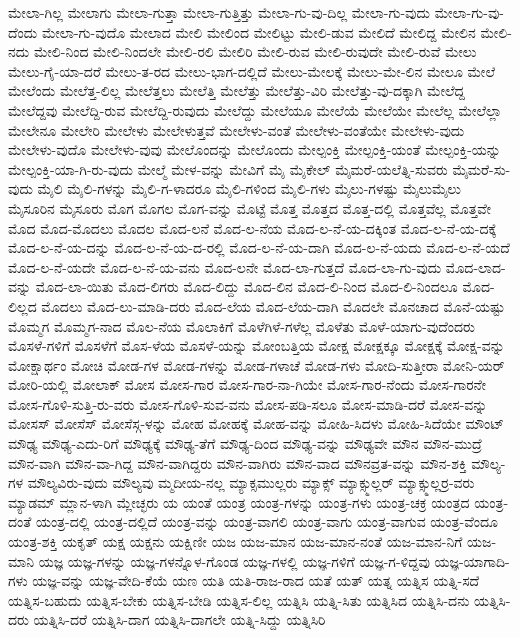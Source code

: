 {ಮೇಲಾ-ಗಿಲ್ಲ
ಮೇಲಾಗು
ಮೇಲಾ-ಗುತ್ತಾ
ಮೇಲಾ-ಗುತ್ತಿತ್ತು
ಮೇಲಾ-ಗು-ವು-ದಿಲ್ಲ
ಮೇಲಾ-ಗು-ವುದು
ಮೇಲಾ-ಗು-ವು-ದೆಂದು
ಮೇಲಾ-ಗು-ವುದೊ
ಮೇಲಾದ
ಮೇಲಿ
ಮೇಲಿಂದ
ಮೇಲಿಟ್ಟು
ಮೇಲಿ-ಡುವ
ಮೇಲಿದೆ
ಮೇಲಿದ್ದ
ಮೇಲಿನ
ಮೇಲಿ-ನದು
ಮೇಲಿ-ನಿಂದ
ಮೇಲಿ-ನಿಂದಲೇ
ಮೇಲಿ-ರಲಿ
ಮೇಲಿರಿ
ಮೇಲಿ-ರುವ
ಮೇಲಿ-ರುವುದೇ
ಮೇಲಿ-ರುವೆ
ಮೇಲು
ಮೇಲು-ಗೈ-ಯಾ-ದರೆ
ಮೇಲು-ತ-ರದ
ಮೇಲು-ಭಾಗ-ದಲ್ಲಿದೆ
ಮೇಲು-ಮೇಲಕ್ಕೆ
ಮೇಲು-ಮೇ-ಲಿನ
ಮೇಲೂ
ಮೇಲೆ
ಮೇಲೆಂದು
ಮೇಲೆತ್ತ-ಲಿಲ್ಲ
ಮೇಲೆತ್ತಲು
ಮೇಲೆತ್ತಿ
ಮೇಲೆತ್ತು
ಮೇಲೆತ್ತು-ವಿರಿ
ಮೇಲೆತ್ತು-ವು-ದಕ್ಕಾಗಿ
ಮೇಲೆದ್ದ
ಮೇಲೆದ್ದವು
ಮೇಲೆದ್ದಿ-ರುವ
ಮೇಲೆದ್ದಿ-ರುವುದು
ಮೇಲೆದ್ದು
ಮೇಲೆಯೂ
ಮೇಲೆಯೆ
ಮೇಲೆಯೇ
ಮೇಲೆಲ್ಲ
ಮೇಲೆಲ್ಲಾ
ಮೇಲೇನೂ
ಮೇಲೇರಿ
ಮೇಲೇಳು
ಮೇಲೇಳುತ್ತವೆ
ಮೇಲೇಳು-ವಂತೆ
ಮೇಲೇಳು-ವಂತೆಯೇ
ಮೇಲೇಳು-ವುದು
ಮೇಲೇಳು-ವುದೊ
ಮೇಲೇಳು-ವುವು
ಮೇಲೊಂದನ್ನು
ಮೇಲೊಂದು
ಮೇಲ್ಪಂಕ್ತಿ
ಮೇಲ್ಪಂಕ್ತಿ-ಯಂತೆ
ಮೇಲ್ಪಂಕ್ತಿ-ಯನ್ನು
ಮೇಲ್ಪಂಕ್ತಿ-ಯಾ-ಗಿ-ರು-ವುದು
ಮೇಲ್ಮೆ
ಮೇಳ-ವನ್ನು
ಮೇವಿಗೆ
ಮೈ
ಮೈಕೇಲ್
ಮೈಮರೆ-ಯಲೆತ್ನಿ-ಸುವರು
ಮೈಮರೆ-ಸು-ವುದು
ಮೈಲಿ
ಮೈಲಿ-ಗಳನ್ನು
ಮೈಲಿ-ಗ-ಳಾದರೂ
ಮೈಲಿ-ಗಳಿಂದ
ಮೈಲಿ-ಗಳು
ಮೈಲು-ಗಳಷ್ಟು
ಮೈಲುಮೈಲು
ಮೈಸೂರಿನ
ಮೈಸೂರು
ಮೊಗ
ಮೊಗಲ
ಮೊಗ-ವನ್ನು
ಮೊಟ್ಟೆ
ಮೊತ್ತ
ಮೊತ್ತದ
ಮೊತ್ತ-ದಲ್ಲಿ
ಮೊತ್ತವೆಲ್ಲ
ಮೊತ್ತವೇ
ಮೊದ
ಮೊದ-ಮೊದಲು
ಮೊದಲ
ಮೊದ-ಲನೆ
ಮೊದ-ಲ-ನೆಯ
ಮೊದ-ಲ-ನೆ-ಯ-ದಕ್ಕಿಂತ
ಮೊದ-ಲ-ನೆ-ಯ-ದಕ್ಕೆ
ಮೊದ-ಲ-ನೆ-ಯ-ದನ್ನು
ಮೊದ-ಲ-ನೆ-ಯ-ದ-ರಲ್ಲಿ
ಮೊದ-ಲ-ನೆ-ಯ-ದಾಗಿ
ಮೊದ-ಲ-ನೆ-ಯದು
ಮೊದ-ಲ-ನೆ-ಯದೆ
ಮೊದ-ಲ-ನೆ-ಯದೇ
ಮೊದ-ಲ-ನೆ-ಯ-ವನು
ಮೊದ-ಲನೇ
ಮೊದ-ಲಾ-ಗುತ್ತದೆ
ಮೊದ-ಲಾ-ಗು-ವುದು
ಮೊದ-ಲಾದ-ವನ್ನು
ಮೊದ-ಲಾ-ಯಿತು
ಮೊದ-ಲಿಗರು
ಮೊದ-ಲಿದ್ದು
ಮೊದ-ಲಿನ
ಮೊದ-ಲಿ-ನಿಂದ
ಮೊದ-ಲಿ-ನಿಂದಲೂ
ಮೊದ-ಲಿಲ್ಲದ
ಮೊದಲು
ಮೊದ-ಲು-ಮಾಡಿ-ದರು
ಮೊದ-ಲೆಯ
ಮೊದ-ಲೆಯ-ದಾಗಿ
ಮೊದಲೇ
ಮೊನಚಾದ
ಮೊನೆ-ಯಷ್ಟು
ಮೊಮ್ಮಗ
ಮೊಮ್ಮಗ-ನಾದ
ಮೊಲ-ನೆಯ
ಮೊಲಾಕಿಗೆ
ಮೊಳೆಗಿಳೆ-ಗಳೆಲ್ಲ
ಮೊಳೆತು
ಮೊಳೆ-ಯಾಗು-ವುದೆಂದರು
ಮೊಸಳೆ-ಗಳಿಗೆ
ಮೊಸಳೆಗೆ
ಮೊಸ-ಳೆಯ
ಮೊಸಳೆ-ಯನ್ನು
ಮೋಂಬತ್ತಿಯ
ಮೋಕ್ಷ
ಮೋಕ್ಷಕ್ಕೂ
ಮೋಕ್ಷಕ್ಕೆ
ಮೋಕ್ಷ-ವನ್ನು
ಮೋಕ್ಷಾರ್ಥಂ
ಮೋಚಿ
ಮೋಡ-ಗಳ
ಮೋಡ-ಗಳನ್ನು
ಮೋಡ-ಗಳಾಚೆ
ಮೋಡ-ಗಳು
ಮೋದಿ-ಸುತ್ತೀರಾ
ಮೋನಿ-ಯರ್
ಮೋರಿ-ಯಲ್ಲಿ
ಮೋಲಾಕ್
ಮೋಸ
ಮೋಸ-ಗಾರ
ಮೋಸ-ಗಾರ-ನಾ-ಗಿಯೇ
ಮೋಸ-ಗಾರ-ನೆಂದು
ಮೋಸ-ಗಾರನೇ
ಮೋಸ-ಗೊಳಿ-ಸುತ್ತಿ-ರು-ವರು
ಮೋಸ-ಗೊಳಿ-ಸುವ-ವನು
ಮೋಸ-ಪಡಿ-ಸಲೂ
ಮೋಸ-ಮಾಡಿ-ದರೆ
ಮೋಸ-ವನ್ನು
ಮೋಸಸ್
ಮೋಸೆಸ್
ಮೋಸೆಸ್ಗ-ಳನ್ನು
ಮೋಹ
ಮೋಹಕ್ಕೆ
ಮೋಹ-ವನ್ನು
ಮೋಹಿ-ಸಿದಳು
ಮೋಹಿ-ಸಿದೆಯೇ
ಮೌಂಟ್
ಮೌಢ್ಯ
ಮೌಢ್ಯ-ಎದು-ರಿಗೆ
ಮೌಢ್ಯಕ್ಕೆ
ಮೌಢ್ಯ-ತೆಗೆ
ಮೌಢ್ಯ-ದಿಂದ
ಮೌಢ್ಯ-ವನ್ನು
ಮೌಢ್ಯವೇ
ಮೌನ
ಮೌನ-ಮುದ್ರೆ
ಮೌನ-ವಾಗಿ
ಮೌನ-ವಾ-ಗಿದ್ದ
ಮೌನ-ವಾಗಿದ್ದರು
ಮೌನ-ವಾಗಿರು
ಮೌನ-ವಾದ
ಮೌನವ್ರತ-ವನ್ನು
ಮೌನ-ಶಕ್ತಿ
ಮೌಲ್ಯ-ಗಳ
ಮೌಲ್ಯವಿರು-ವುದು
ಮೌಲ್ಯವು
ಮ್ಮದೀಯ-ನಲ್ಲ
ಮ್ಯಾಕ್ಸಮುಲ್ಲರು
ಮ್ಯಾಕ್ಸ್
ಮ್ಯಾಕ್ಸ್ಮುಲ್ಲರ್
ಮ್ಯಾಕ್ಸ್ಮುಲ್ಲರ್ರ-ವರು
ಮ್ಯಾಡಮ್
ಮ್ಲಾನ-ಳಾಗಿ
ಮ್ಲೇಚ್ಛರು
ಯ
ಯಂತೆ
ಯಂತ್ರ
ಯಂತ್ರ-ಗಳನ್ನು
ಯಂತ್ರ-ಗಳು
ಯಂತ್ರ-ಚಕ್ರ
ಯಂತ್ರದ
ಯಂತ್ರ-ದಂತೆ
ಯಂತ್ರ-ದಲ್ಲಿ
ಯಂತ್ರ-ದಲ್ಲಿದೆ
ಯಂತ್ರ-ವನ್ನು
ಯಂತ್ರ-ವಾಗಲಿ
ಯಂತ್ರ-ವಾಗು
ಯಂತ್ರ-ವಾಗುವ
ಯಂತ್ರ-ವೆಂದೂ
ಯಂತ್ರ-ಶಕ್ತಿ
ಯಕೃತ್
ಯಕ್ಷ
ಯಕ್ಷನು
ಯಕ್ಷಿಣೀ
ಯಜ
ಯಜ-ಮಾನ
ಯಜ-ಮಾನ-ನಂತೆ
ಯಜ-ಮಾನ-ನಿಗೆ
ಯಜ-ಮಾನಿ
ಯಜ್ಞ
ಯಜ್ಞ-ಗಳನ್ನು
ಯಜ್ಞ-ಗಳನ್ನೊಳ-ಗೊಂಡ
ಯಜ್ಞ-ಗಳಲ್ಲಿ
ಯಜ್ಞ-ಗಳಿಗೆ
ಯಜ್ಞ-ಗ-ಳಿದ್ದವು
ಯಜ್ಞ-ಯಾಗಾದಿ-ಗಳು
ಯಜ್ಞ-ವನ್ನು
ಯಜ್ಞ-ವೇದಿ-ಕೆಯೆ
ಯಣ
ಯತಿ
ಯತಿ-ರಾಜ-ರಾದ
ಯತೆ
ಯತ್
ಯತ್ನ
ಯತ್ನಿಸ
ಯತ್ನಿ-ಸದೆ
ಯತ್ನಿಸ-ಬಹುದು
ಯತ್ನಿಸ-ಬೇಕು
ಯತ್ನಿಸ-ಬೇಡಿ
ಯತ್ನಿಸ-ಲಿಲ್ಲ
ಯತ್ನಿಸಿ
ಯತ್ನಿ-ಸಿತು
ಯತ್ನಿಸಿದ
ಯತ್ನಿಸಿ-ದನು
ಯತ್ನಿಸಿ-ದರು
ಯತ್ನಿಸಿ-ದರೆ
ಯತ್ನಿಸಿ-ದಾಗ
ಯತ್ನಿಸಿ-ದಾಗಲೇ
ಯತ್ನಿ-ಸಿದ್ದು
ಯತ್ನಿಸಿರಿ
}
